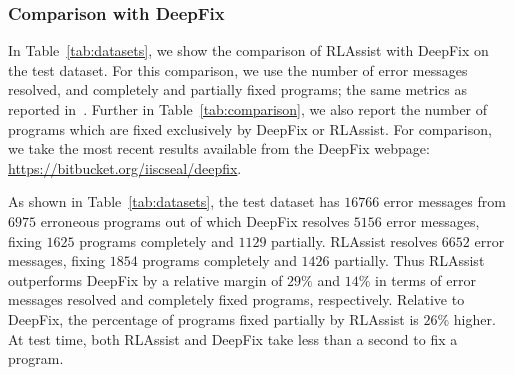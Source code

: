 \documentclass{article}
\begin{document}
\subsubsection{Comparison with DeepFix}

\begin{table}[t]
	\centering
	\caption{Comparison of DeepFix and RLAssist on the number of programs fixed exclusively by each technique.}
	\label{tab:comparison}
\end{table}

In Table~\ref{tab:datasets}, we show the comparison of RLAssist with DeepFix on the test dataset.
For this comparison, we use the number of error messages resolved, and completely and partially fixed programs; the same metrics as reported in~\cite{gupta2017deepfix}.
Further in Table~\ref{tab:comparison}, we also report the number of programs which are fixed exclusively by DeepFix or RLAssist.
For comparison, we take the most recent results available from the DeepFix webpage: {\small{\url{https://bitbucket.org/iiscseal/deepfix}}}.

As shown in Table~\ref{tab:datasets}, the test dataset has $ 16766 $ error messages from $ 6975 $ erroneous programs out of which DeepFix resolves $ 5156 $ error messages, fixing $ 1625 $ programs completely and $ 1129 $ partially.
RLAssist resolves $ 6652 $ error messages, fixing $ 1854 $ programs completely and $ 1426 $ partially.
Thus RLAssist outperforms DeepFix by a relative margin of $ 29\% $ and $ 14\% $ in terms of error messages resolved and completely fixed programs, respectively.
Relative to DeepFix, the percentage of programs fixed partially by RLAssist is $26\%$ higher.
At test time, both RLAssist and DeepFix take less than a second to fix a program.
\end{document}
